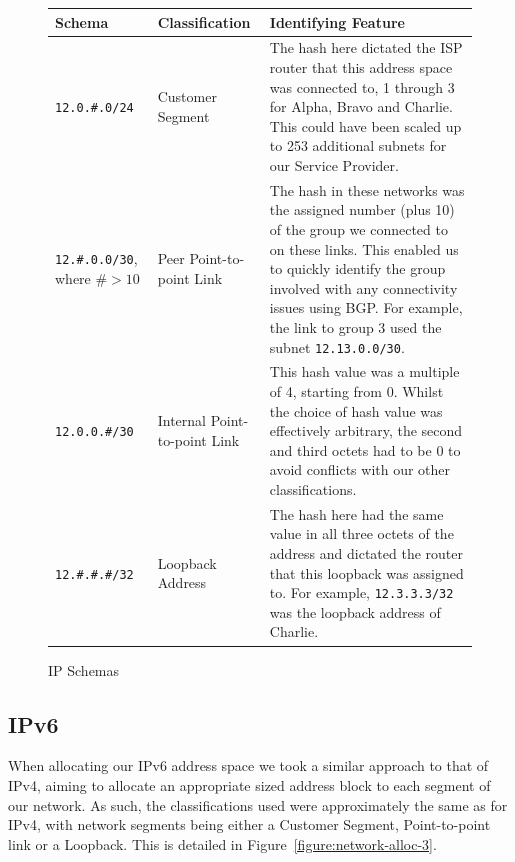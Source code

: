 \begin{figure}[!ht]
    \caption{IP Schemas}
    \label{figure:network-alloc-2}
    \centering
    \begin{tabular}{|p{3cm}|p{3cm}|p{5cm}|}

        \hline
        \textbf{Schema} & \textbf{Classification} & \textbf{Identifying Feature} \\

        \hline
        \texttt{12.0.\#.0/24} & Customer Segment & The hash here dictated the
        ISP router that this address space was connected to, 1 through 3 for
        Alpha, Bravo and Charlie. This could have been scaled up to 253
        additional subnets for our Service Provider.\\
        \hline
        \texttt{12.\#.0.0/30}, where $\#> 10$ & Peer Point-to-point Link &
        The hash in these networks was the assigned number (plus 10) of the group we
        connected to on these links. This enabled us to quickly identify the
        group involved with any connectivity issues using BGP. For example, the
        link to group 3 used the subnet \texttt{12.13.0.0/30}.\\
        \hline
        \texttt{12.0.0.\#/30} & Internal Point-to-point Link &
        This hash value was a multiple of 4, starting from 0. Whilst the choice
        of hash value was effectively arbitrary, the second and third octets had
        to be 0 to avoid conflicts with our other classifications.\\
        \hline
        \texttt{12.\#.\#.\#/32} & Loopback Address & The hash here had
        the same value in all three octets of the address and dictated the
        router that this loopback was assigned to. For example,
        \texttt{12.3.3.3/32} was the loopback address of Charlie.\\

        \hline
    \end{tabular}
\end{figure}

\clearpage

\subsection{IPv6}
When allocating our IPv6 address space we took a similar approach to that of
IPv4, aiming to allocate an appropriate sized address block to each segment of
our network. As such, the classifications used were approximately the same as
for IPv4, with network segments being either a Customer Segment, Point-to-point
link or a Loopback. This is detailed in Figure~\ref{figure:network-alloc-3}.

